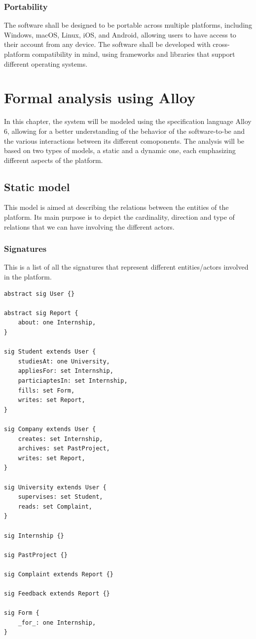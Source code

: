 \documentclass[11pt,twoside]{article}
\begin{document}
		\subsubsection{Portability}
		
The software shall be designed to be portable across multiple platforms, including Windows, macOS, Linux, iOS, and Android, allowing users to have access to their account from any device. The software shall be developed with cross-platform compatibility in mind, using frameworks and libraries that support different operating systems.	

\newpage
		
\section{Formal analysis using Alloy}
In this chapter, the system will be modeled using the specification language Alloy 6, allowing for a better understanding of the behavior of the software-to-be and the various interactions between its different comoponents. The analysis will be based on two types of models, a static and a dynamic one, each emphasizing different aspects of the platform.
	\subsection{Static model}
This model is aimed at describing the relations between the entities of the platform. Its main purpose is to depict the cardinality, direction and type of relations that we can have involving the different actors.
		\subsubsection{Signatures}
This is a list of all the signatures that represent different entities/actors involved in the platform.
{\small
\begin{verbatim}
abstract sig User {}

abstract sig Report {
    about: one Internship,
}

sig Student extends User {
	studiesAt: one University,
    appliesFor: set Internship,
    particiaptesIn: set Internship,
    fills: set Form,
    writes: set Report,
}

sig Company extends User {
    creates: set Internship,
    archives: set PastProject,
    writes: set Report,
}

sig University extends User {
    supervises: set Student,
    reads: set Complaint,
}

sig Internship {}

sig PastProject {}

sig Complaint extends Report {}

sig Feedback extends Report {}

sig Form {
    _for_: one Internship,
}
\end{verbatim}}
\end{document}
